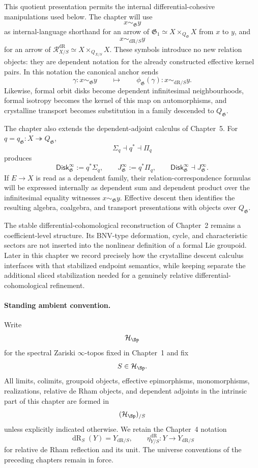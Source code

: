 This quotient presentation permits the internal differential-cohesive
manipulations used below.  The chapter will use
\[
    x\sim_{\mathfrak G}y
\]
as internal-language shorthand for an arrow of
$\mathfrak G_1\simeq X\times_{Q_{\mathfrak G}}X$ from $x$ to $y$, and
\[
    x\sim_{\mathrm{dR}/S}y
\]
for an arrow of
$\mathcal R^{\mathrm{dR}}_{X/S}\simeq X\times_{Q_{X/S}}X$.
These symbols introduce no new relation objects: they are dependent notation
for the already constructed effective kernel pairs.  In this notation the
canonical anchor sends
\[
    \gamma:x\sim_{\mathfrak G}y
    \qquad\longmapsto\qquad
    \phi_{\mathfrak G}(\gamma):
    x\sim_{\mathrm{dR}/S}y.
\]
Likewise, formal orbit disks become dependent infinitesimal neighbourhoods,
formal isotropy becomes the kernel of this map on automorphisms, and crystalline
transport becomes substitution in a family descended to
$Q_{\mathfrak G}$.

The chapter also extends the dependent-adjoint calculus of Chapter~5.  For
$q=q_{\mathfrak G}:X\twoheadrightarrow Q_{\mathfrak G}$,
\[
    \Sigma_q\dashv q^*\dashv\Pi_q
\]
produces
\[
    \mathsf{Disk}^{\infty}_{\mathfrak G}:=q^*\Sigma_q,
    \qquad
    J^\infty_{\mathfrak G}:=q^*\Pi_q,
    \qquad
    \mathsf{Disk}^{\infty}_{\mathfrak G}\dashv J^\infty_{\mathfrak G}.
\]
If $E\to X$ is read as a dependent family, their relation-correspondence
formulas will be expressed internally as dependent sum and dependent product
over the infinitesimal equality witnesses
$x\sim_{\mathfrak G}y$.  Effective descent then identifies the resulting
algebra, coalgebra, and transport presentations with objects over
$Q_{\mathfrak G}$.

The stable differential-cohomological reconstruction of Chapter~2 remains a
coefficient-level structure.  Its BNV-type deformation, cycle, and
characteristic sectors are not inserted into the nonlinear definition of a
formal Lie groupoid.  Later in this chapter we record precisely how the crystalline
descent calculus interfaces with that stabilized endpoint semantics, while
keeping separate the additional sliced stabilization needed for a genuinely
relative differential-cohomological refinement.

\paragraph{Standing ambient convention.}
Write
\[
    \mathcal H_{\Sp}
\]
for the spectral Zariski $\infty$-topos fixed in Chapter~1 and fix
\[
    S\in\mathcal H_{\Sp}.
\]
All limits, colimits, groupoid objects, effective epimorphisms,
monomorphisms, realizations, relative de Rham objects, and dependent adjoints
in the intrinsic part of this chapter are formed in
\[
    (\mathcal H_{\Sp})_{/S}
\]
unless explicitly indicated otherwise.  We retain the Chapter~4 notation
\[
    \operatorname{dR}_S(Y)=Y_{\mathrm{dR}/S},
    \qquad
    \eta_{Y/S}^{\mathrm{dR}}:Y\longrightarrow Y_{\mathrm{dR}/S}
\]
for relative de Rham reflection and its unit.  The universe conventions of the
preceding chapters remain in force.

